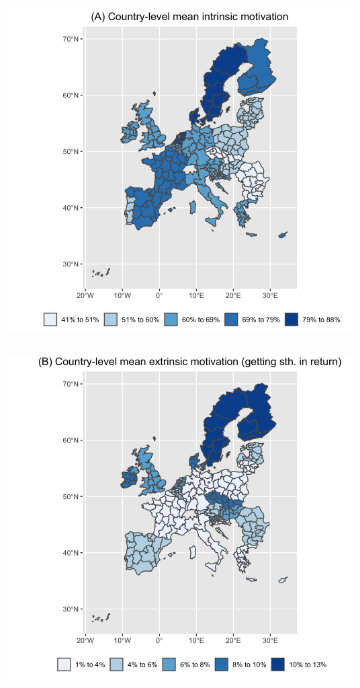 \documentclass[AER]{AEA}
\begin{document}
\begin{figure}
\begin{subfigure}{.48\textwidth}
  \centering
  \includegraphics[width=\linewidth]{images/IM_countries.png}  
\end{subfigure}
\begin{subfigure}{.48\textwidth}
  \centering
  \includegraphics[width=\linewidth]{images/EM_get_return_countries.png}  
\end{subfigure}


\end{figure}
\end{document}
